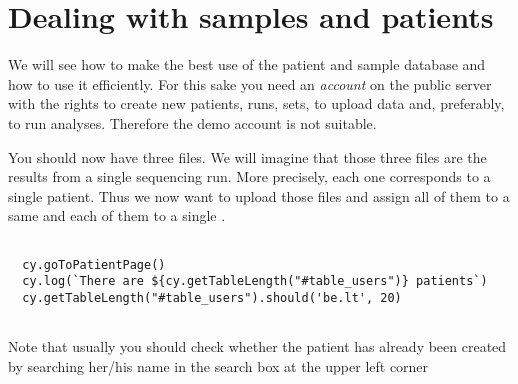 \section{Dealing with samples and patients}
We will see how to make the best use of the patient and sample database and
how to use it efficiently.
For this sake you need an \textit{account} on the public server with the rights to create new patients,
runs, sets, to upload data and, preferably, to run analyses.
Therefore the demo account is not suitable.




You should now have three files. We will imagine that those three files are
the results from a single sequencing run. More precisely, each one corresponds to
a single patient. Thus we now want to upload those files and assign all of
them to a same  and each of them to a single .

\begin{verbatim}

  cy.goToPatientPage()
  cy.log(`There are ${cy.getTableLength("#table_users")} patients`)
  cy.getTableLength("#table_users").should('be.lt', 20)


\end{verbatim}

Note that usually you should check whether the patient has
already been created by searching her/his name in the search box at the
upper left corner

